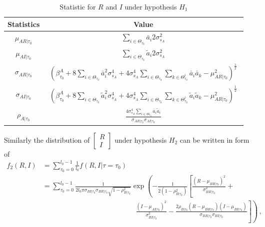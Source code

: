 \begin{table}[h]
\centering
  \begin{tabular}{|c|c|}
	\hline
	Statistics          & Value                                                                                                                                                                                                                 \\ \hline
	$\mu_{AR|\tau_0}$    & $\displaystyle{\sum_{i\in\Theta_{\tau_0}}\bar{a}_i2\sigma_{s_A}^2}$                                                                                                                                                                      \\ \hline
    $\mu_{AI|\tau_0}$    & $\displaystyle{\sum_{i\in\Theta_{\tau_0}}\tilde{a}_i2\sigma_{s_A}^2}$                                                                                                                                                                           \\ \hline
    $\sigma_{AR|\tau_0}$ & $\displaystyle{\left(\beta_{\tau_0}^A+8\sum_{i\in\Theta_{\tau_0}}\bar{a}_i^2\sigma_{s_A}^4 + 4\sigma_{s_A}^4\sum_{i\in\Theta_{\tau_0}}\sum_{k\in\Theta_{\tau_0}^i}\bar{a}_i\bar{a}_k- \mu_{AR|\tau_0}^2 \right)^\frac{1}{2}}$  \\ \hline
    $\sigma_{AI|\tau_0}$ & 
    $\begin{array} {l} \displaystyle{\left(\beta_{\tau_0}^A +8\sum_{i\in\Theta_{\tau_0}}\tilde{a}_i^2\sigma_{s_A}^4 +4\sigma_{s_A}^4\sum_{i\in\Theta_{\tau_0}}\sum_{k\in\Theta_{\tau_0}^i}\tilde{a}_i\tilde{a}_k- \mu_{AR|\tau_0}^2\right)^\frac{1}{2}}\end{array}$ 
    \\ \hline
	$\rho_{A|\tau_0}$    & $ \displaystyle{\frac{4\sigma_{s_A}^4\sum_{i\in\Theta_{\tau_0}}\bar{a}_i\tilde{a}_i}{\sigma_{AR|\tau_0}\sigma_{AI|\tau_0}}}$                                                                            \\ \hline
  \end{tabular}
  \caption{Statistic for $R$ and $I$ under hypothesis $H_1$}
  \label{Table2}
\end{table}
Similarly the distribution of  
$\begin{bmatrix}
  R \\
  I
\end{bmatrix}$
under hypothesis $H_2$ can be written in form of 
\begin{equation}
  \begin{split}
	f_2(R, I) &= \sum_{\tau_0 = 0}^{l_0-1} \frac{1}{l_0}f(R, I|\tau=\tau_0)\\
	&= \sum_{\tau_0 = 0}^{l_0-1}\frac{1}{2l_0\pi\sigma_{BI|\tau_0}\sigma_{BR|\tau_0}\sqrt{1 - \rho_{B|\tau_0}^2}}\exp\left( -\frac{1}{2(1-\rho_{B|\tau_0}^2)}\left[ \frac{(R-\mu_{BR|\tau_0})^2}{\sigma_{BR|\tau_0}^2} + \right.\right.\\
	& \left. \left. \;\;\;\;\;\;\;\;\;\;\;\;\;\;\;\; \;\;\;\;\;\;\;\;\;\;\;\;\;\;\;\; \;\;\;\;\;\;\;\;\;\;\;\;\;\;\;\; \frac{(I-\mu_{AI|\tau_0})^2}{\sigma_{BI|\tau_0}^2} - \frac{2\rho_{B|\tau_0}(R-\mu_{BR|\tau_0})(I-\mu_{BI|\tau_0})}{\sigma_{BR|\tau_0}\sigma_{BI|\tau_0}}\right] \right)\,,
  \end{split}
  \label{f_2underH2}
\end{equation}
